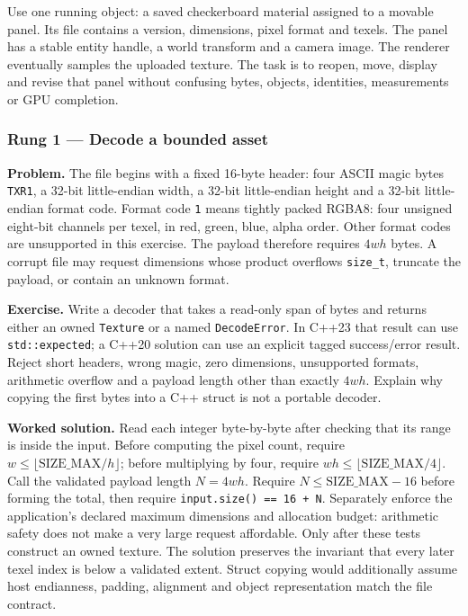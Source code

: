 Use one running object: a saved checkerboard material assigned to a movable panel. Its file contains a version, dimensions, pixel format and texels. The panel has a stable entity handle, a world transform and a camera image. The renderer eventually samples the uploaded texture. The task is to reopen, move, display and revise that panel without confusing bytes, objects, identities, measurements or GPU completion.

\subsubsection{Rung 1 --- Decode a bounded asset}\label{rung-1-decode-a-bounded-asset}

\textbf{Problem.} The file begins with a fixed 16-byte header: four ASCII magic bytes \texttt{TXR1}, a 32-bit little-endian width, a 32-bit little-endian height and a 32-bit little-endian format code. Format code \texttt{1} means tightly packed RGBA8: four unsigned eight-bit channels per texel, in red, green, blue, alpha order. Other format codes are unsupported in this exercise. The payload therefore requires \(4wh\) bytes. A corrupt file may request dimensions whose product overflows \texttt{size\_t}, truncate the payload, or contain an unknown format.

\textbf{Exercise.} Write a decoder that takes a read-only span of bytes and returns either an owned \texttt{Texture} or a named \texttt{DecodeError}. In C++23 that result can use \texttt{std::expected}; a C++20 solution can use an explicit tagged success/error result. Reject short headers, wrong magic, zero dimensions, unsupported formats, arithmetic overflow and a payload length other than exactly \(4wh\). Explain why copying the first bytes into a C++ struct is not a portable decoder.

\textbf{Worked solution.} Read each integer byte-by-byte after checking that its range is inside the input. Before computing the pixel count, require \(w \le \lfloor\text{SIZE_MAX}/h\rfloor\); before multiplying by four, require \(wh \le \lfloor\text{SIZE_MAX}/4\rfloor\). Call the validated payload length \(N=4wh\). Require \(N\leq\mathrm{SIZE\_MAX}-16\) before forming the total, then require \texttt{input.size()\ ==\ 16\ +\ N}. Separately enforce the application's declared maximum dimensions and allocation budget: arithmetic safety does not make a very large request affordable. Only after these tests construct an owned texture. The solution preserves the invariant that every later texel index is below a validated extent. Struct copying would additionally assume host endianness, padding, alignment and object representation match the file contract.

